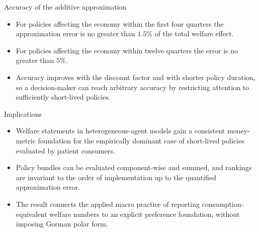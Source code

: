 \documentclass[aspectratio=169,11pt]{beamer}
\begin{document}
\begin{frame}{Accuracy of the additive approximation}
  \begin{itemize}
    \item For policies affecting the economy within the first four quarters
          the approximation error is no greater than $1.5\%$ of the total
          welfare effect.
    \item For policies affecting the economy within twelve quarters the
          error is no greater than $5\%$.
    \item Accuracy improves with the discount factor and with shorter policy
          duration, so a decision-maker can reach arbitrary accuracy by
          restricting attention to sufficiently short-lived policies.
  \end{itemize}
\end{frame}

\begin{frame}{Implications}
  \begin{itemize}
    \item Welfare statements in heterogeneous-agent models gain a consistent
          money-metric foundation for the empirically dominant case of
          short-lived policies evaluated by patient consumers.
    \item Policy bundles can be evaluated component-wise and summed, and
          rankings are invariant to the order of implementation up to the
          quantified approximation error.
    \item The result connects the applied macro practice of reporting
          consumption-equivalent welfare numbers to an explicit preference
          foundation, without imposing Gorman polar form.
  \end{itemize}
\end{frame}
\end{document}
